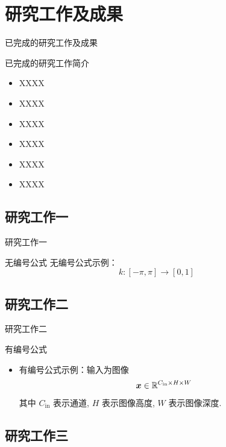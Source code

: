 \documentclass[9pt]{ctexbeamer}
\begin{document}
\section{研究工作及成果}

\begin{frame}{已完成的研究工作及成果}
  \begin{block}{已完成的研究工作简介}
    \begin{itemize}
      \setlength{\itemsep}{6pt}
      \item XXXX
      \item XXXX
      \item XXXX
      \item XXXX
      \item XXXX
      \item XXXX
    \end{itemize}
  \end{block}
\end{frame}

\subsection{研究工作一}

\begin{frame}{研究工作一}
  \begin{block}{无编号公式}
    无编号公式示例：
    $$
      k:[-\pi,\pi] \rightarrow [0,1]
    $$
  \end{block}
\end{frame}

\subsection{研究工作二}

\begin{frame}{研究工作二}
  \begin{block}{有编号公式}
    \begin{itemize}
      \item 有编号公式示例：输入为图像 
      \begin{equation}
        \bm{x}\in\mathbb{R}^{C_{\text{in}}\times H\times W}
      \end{equation}
      其中 $C_{\text{in}}$ 表示通道, $H$ 表示图像高度, $W$ 表示图像深度.
    \end{itemize}
  \end{block}
\end{frame}

\subsection{研究工作三}
\end{document}
